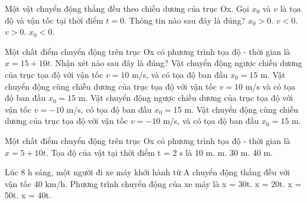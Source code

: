 \begin{ex}
Một vật chuyển động thẳng đều theo chiều dương của trục Ox. Gọi $x_0$ và $v$ là tọa độ và vận tốc tại thời điểm $t=0$. Thông tin nào sau đây là đúng?
\choice
{$x_0 > 0$.}
{$v < 0$.}
{\True $v > 0$.}
{$x_0 < 0$.}
\end{ex}

\begin{ex}
Một chất điểm chuyển động trên trục Ox có phương trình tọa độ - thời gian là $x = 15 + 10t$. Nhận xét nào sau đây là đúng?
\choice
{Vật chuyển động ngược chiều dương của trục tọa độ với vận tốc $v = 10$ m/s, và có tọa độ ban đầu $x_0 = 15$ m.}
{\True Vật chuyển động cùng chiều dương của trục tọa độ với vận tốc $v = 10$ m/s và có tọa độ ban đầu $x_0 = 15$ m.}
{Vật chuyển động ngược chiều dương của trục tọa độ với vận tốc $v = -10$ m/s, có tọa độ ban đầu $x_0 = 15$ m.}
{Vật chuyển động cùng chiều dương của trục tọa độ với vận tốc $v = -10$ m/s, và có tọa độ ban đầu $x_0 = 15$ m.}
\end{ex}

\begin{ex}
Một chất điểm chuyển động trên trục Ox có phương trình tọa độ - thời gian là $x = 5 + 10t$. Tọa độ của vật tại thời điểm t = 2 s là
\choice
{10 m.}
{ m.}
{30 m.}
{40 m.}
\end{ex}

\begin{ex}
Lúc 8 h sáng, một người đi xe máy khởi hành từ A chuyển động thẳng đều với vận tốc 40 km/h. Phương trình chuyển động của xe máy là
\choice
{x = 30t.}
{x = 20t.}
{x = 50t.}
{\True x = 40t.}
\end{ex}

